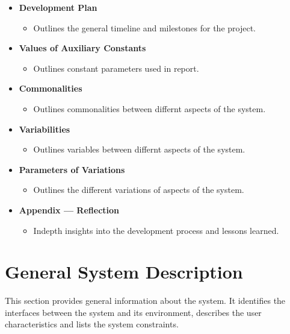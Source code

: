 \begin{itemize}
    \item \textbf{Development Plan} 
    \begin{itemize}
        \item Outlines the general timeline and milestones for the project.
    \end{itemize}
    
    \item \textbf{Values of Auxiliary Constants} 
    \begin{itemize}
        \item Outlines constant parameters used in report.
    \end{itemize}
    
    \item \textbf{Commonalities} 
    \begin{itemize}
        \item Outlines commonalities between differnt aspects of the system.
    \end{itemize}
    
    \item \textbf{Variabilities} 
    \begin{itemize}
        \item Outlines variables between differnt aspects of the system.
    \end{itemize}
    
    \item \textbf{Parameters of Variations} 
    \begin{itemize}
        \item Outlines the different variations of aspects of the system.
    \end{itemize}
    
    \item \textbf{Appendix — Reflection} 
    \begin{itemize}
        \item Indepth insights into the development process and lessons learned.
    \end{itemize}
\end{itemize}


\newpage
\section{General System Description}

This section provides general information about the system.  It identifies the
interfaces between the system and its environment, describes the user
characteristics and lists the system constraints.

